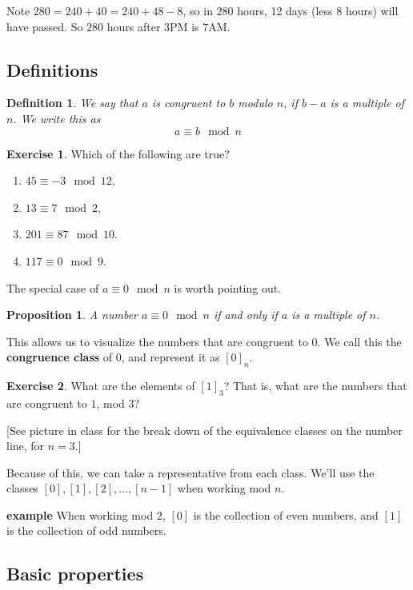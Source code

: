 \documentclass[11pt]{article}
\newtheorem{dfn}[thm]{Definition}
\newtheorem{prop}[thm]{Proposition}
\theoremstyle{definition}
\newtheorem{exercise}{Exercise}
\numberwithin{thm}{section}
\begin{document}
Note $280 = 240 + 40 = 240 + 48 - 8$, so in $280$ hours, 12 days (less 8 hours) will have passed. So $280$ hours after $3$PM is $7$AM.

\subsection{Definitions}

\begin{dfn} We say that $a$ is congruent to $b$ modulo $n$, if $b-a$ is a multiple of $n$. We write this as
\[
	a \equiv b \mod n
\]
\end{dfn}

\begin{exercise} Which of the following are true?
\begin{enumerate}
	\item $45 \equiv -3 \mod 12$,
    \item $13 \equiv 7 \mod 2$,
    \item $201 \equiv 87 \mod 10$.
    \item $117 \equiv 0 \mod 9$.
\end{enumerate}
\end{exercise}

The special case of $a \equiv 0 \mod n$ is worth pointing out.

\begin{prop} A number $a \equiv 0 \mod n$ if and only if $a$ is a multiple of $n$.
\end{prop}

This allows us to visualize the numbers that are congruent to $0$. We call this the \textbf{congruence class} of $0$, and represent it as $[0]_n$.

\begin{exercise} What are the elements of $[1]_3$? That is, what are the numbers that are congruent to $1$, mod $3$?
\end{exercise}

[See picture in class for the break down of the equivalence classes on the number line, for $n=3$.]

Because of this, we can take a representative from each class. We'll use the classes $[0], [1], [2], \ldots, [n-1]$ when working mod $n$.

\textbf{example} When working mod $2$, $[0]$ is the collection of even numbers, and $[1]$ is the collection of odd numbers.

\subsection{Basic properties}
\end{document}
